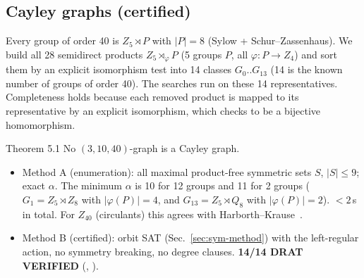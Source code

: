 \subsection{Cayley graphs (certified)}\label{sec:sym-cayley}
Every group of order 40 is $Z_5 \rtimes P$ with $|P| = 8$ (Sylow + Schur--Zassenhaus). We build all 28
semidirect products $Z_5 \rtimes_\varphi P$ (5 groups $P$, all $\varphi: P \to Z_4$) and sort them by an explicit isomorphism
test into 14 classes $G_0..G_{13}$ (14 is the known number of groups of order 40). The searches run on these
14 representatives. Completeness holds because each removed product is mapped to its representative
by an explicit isomorphism, which  checks to be a bijective homomorphism.

\begin{namedthm}{Theorem 5.1}
No $(3,10,40)$-graph is a Cayley graph.
\end{namedthm}
\begin{itemize}
\item Method A (enumeration): all maximal product-free symmetric sets $S$, $|S| \le 9$; exact $\alpha$.
  The minimum $\alpha$ is 10 for 12 groups and 11 for 2 groups ($G_1 = Z_5 \rtimes Z_8$ with $|\varphi(P)| = 4$, and
  $G_{13} = Z_5 \rtimes Q_8$ with $|\varphi(P)| = 2$). $< 2$\,s in total.
  For $Z_{40}$ (circulants) this agrees with Harborth--Krause~\cite{HaKr}.
\item Method B (certified): orbit SAT (Sec.~\ref{sec:sym-method}) with the left-regular action, no symmetry breaking,
  no degree clauses. \textbf{14/14 DRAT VERIFIED} (, ).
\end{itemize}

